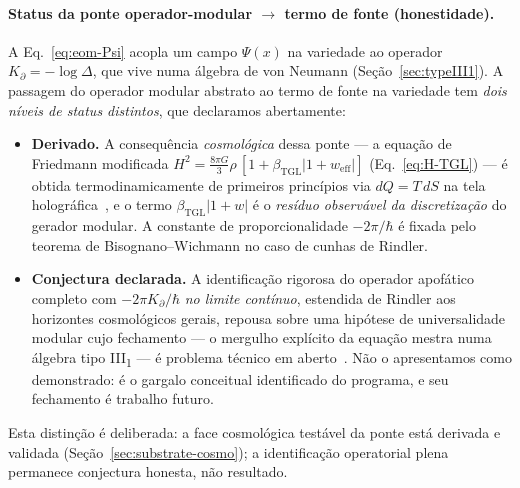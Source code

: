\documentclass[12pt,a4paper]{article}
\newcommand{\betatgl}{\beta_{\text{TGL}}}
\newcommand{\Kpartial}{K_{\partial}}
\begin{document}
\paragraph{Status da ponte operador-modular $\to$ termo de fonte (honestidade).}
A Eq.~\eqref{eq:eom-Psi} acopla um campo $\Psi(x)$ na variedade ao operador
$\Kpartial = -\log\Delta$, que vive numa álgebra de von Neumann (Seção~\ref{sec:typeIII1}).
A passagem do operador modular abstrato ao termo de fonte na variedade tem
\emph{dois níveis de status distintos}, que declaramos abertamente:
\begin{itemize}[leftmargin=*]
\item \textbf{Derivado.} A consequência \emph{cosmológica} dessa ponte --- a
equação de Friedmann modificada
$H^2 = \tfrac{8\pi G}{3}\rho\,[1 + \betatgl|1+w_{\text{eff}}|]$
(Eq.~\ref{eq:H-TGL}) --- é obtida termodinamicamente de primeiros
princípios via $dQ = T\,dS$ na tela holográfica~\cite{MiguelCurvatura}, e o
termo $\betatgl|1+w|$ é o \emph{resíduo observável da discretização} do gerador
modular.  A constante de proporcionalidade $-2\pi/\hbar$ é fixada pelo teorema de
Bisognano--Wichmann no caso de cunhas de Rindler.
\item \textbf{Conjectura declarada.} A identificação rigorosa do operador
apofático completo com $-2\pi\Kpartial/\hbar$ \emph{no limite contínuo}, estendida
de Rindler aos horizontes cosmológicos gerais, repousa sobre uma hipótese de
universalidade modular cujo fechamento --- o mergulho explícito da equação
mestra numa álgebra tipo III\textsubscript{1} --- é problema técnico em
aberto~\cite{MiguelCurvatura}.  Não o apresentamos como demonstrado: é o gargalo
conceitual identificado do programa, e seu fechamento é trabalho futuro.
\end{itemize}
Esta distinção é deliberada: a face cosmológica testável da ponte está derivada
e validada (Seção~\ref{sec:substrate-cosmo}); a identificação operatorial plena
permanece conjectura honesta, não resultado.
\end{document}
